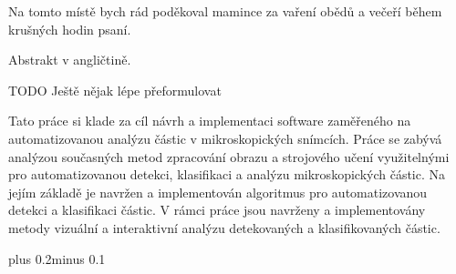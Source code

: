 \documentclass[11pt,twoside,a4paper,table]{book}
\begin{document}

\coverpagestarts


\acknowledgements
\noindent
Na tomto místě bych rád poděkoval mamince za vaření obědů a večeří během krušných hodin psaní.





 
\abstractpage

Abstrakt v angličtině.


\baselineskip

\noindent
TODO Ještě nějak lépe přeformulovat

Tato práce si klade za cíl návrh a implementaci software zaměřeného na automatizovanou analýzu částic v mikroskopických snímcích. Práce se zabývá analýzou současných metod zpracování obrazu a strojového učení využitelnými pro automatizovanou detekci, klasifikaci a analýzu mikroskopických částic. Na jejím základě je navržen a implementován algoritmus pro automatizovanou detekci a klasifikaci částic. V rámci práce jsou navrženy a implementovány metody vizuální a interaktivní analýzu detekovaných a klasifikovaných částic.

\tableofcontents

\listoffigures

\listoftables


\mainbodystarts
\fontsize{11pt}{15pt}\selectfont
{}\baselineskip plus 0.2\baselineskip minus 0.1\baselineskip

\end{document}
